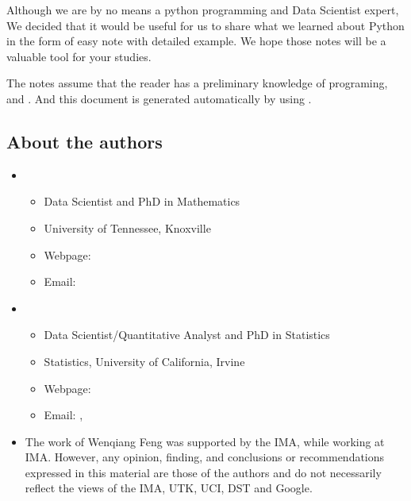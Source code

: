 \documentclass[letterpaper,12pt,english]{sphinxmanual}
\begin{document}
Although we are by no means a python programming and Data Scientist expert,
We decided that it would be useful for us to share what we learned
about Python in the form of easy note with detailed example.
We hope those notes will be a valuable tool for your studies.

The notes assume that the reader has a preliminary knowledge of  programing,  and . And this document is generated automatically by using .


\subsection{About the authors}
\label{\detokenize{preface:about-the-authors}}\begin{itemize}
\item {} 
\begin{itemize}
\item {} 
Data Scientist and PhD in Mathematics

\item {} 
University of Tennessee, Knoxville

\item {} 
Webpage: 

\item {} 
Email: 

\end{itemize}

\item {} 
\begin{itemize}
\item {} 
Data Scientist/Quantitative Analyst and PhD in Statistics

\item {} 
Statistics, University of California, Irvine

\item {} 
Webpage: 

\item {} 
Email: , 

\end{itemize}

\item {} 

The work of Wenqiang Feng was supported by the IMA, while working at IMA. However, any opinion, finding, and conclusions or recommendations expressed in this material are those of the authors and do not necessarily reflect the views of the IMA, UTK, UCI, DST and Google.

\end{itemize}
\end{document}
